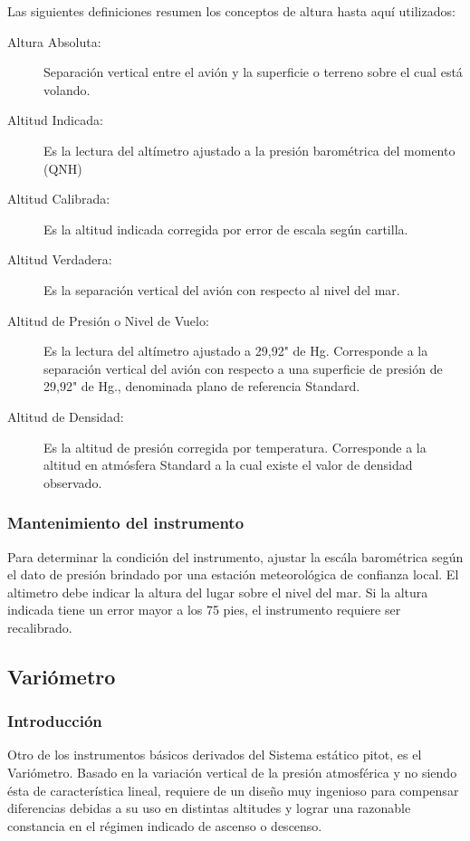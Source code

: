\documentclass{article}
\begin{document}
Las siguientes definiciones resumen los conceptos de altura hasta aquí utilizados:
\begin{description}
\item[Altura Absoluta:] Separación vertical entre el avión y la superficie o terreno sobre el cual está volando.
\item[Altitud Indicada:] Es la lectura del altímetro ajustado a la presión barométrica del momento (QNH)
\item[Altitud Calibrada:] Es la altitud indicada corregida por error de escala según cartilla.
\item[Altitud Verdadera:] Es la separación vertical del avión con respecto al nivel del mar.
\item[Altitud de Presión o Nivel de Vuelo:] Es la lectura del altímetro ajustado a 29,92" de Hg. Corresponde a la separación vertical del avión con respecto a una superficie de presión de 29,92" de Hg., denominada plano de referencia
Standard.
\item[Altitud de Densidad:] Es la altitud de presión corregida por temperatura. Corresponde a la altitud en atmósfera Standard a la cual existe el valor de densidad observado.
\end{description}



\subsubsection*{Mantenimiento del instrumento}
Para determinar la condición del instrumento, ajustar la escála barométrica según el dato de presión brindado por una estación meteorológica de confianza local. El altimetro debe indicar la altura del lugar sobre el nivel del mar. Si la altura indicada tiene un error mayor a los 75 pies, el instrumento requiere ser recalibrado.




\subsection{Variómetro}
\subsubsection*{Introducción}
Otro de los instrumentos básicos derivados del Sistema estático pitot, es el Variómetro. Basado en la variación vertical de la presión atmosférica y no siendo ésta de característica lineal, requiere de un diseño muy ingenioso para compensar diferencias debidas a su uso en distintas altitudes y lograr una razonable constancia en el régimen indicado de ascenso o descenso.
\end{document}
